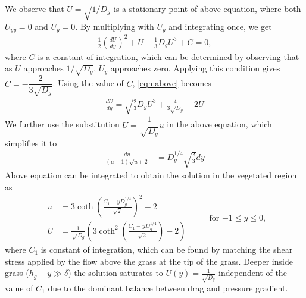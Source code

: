 \documentclass[letterpaper,10pt]{article}
\begin{document}
\noindent
We observe that $U = \sqrt{1/D_g}$ is a stationary point of above equation, where both $U_{yy}=0$ and $U_y =0 $. By multiplying with $U_y$ and integrating once, we get
\begin{equation}
\begin{split}
 \frac{1}{2} \left( \frac{dU}{dy} \right)^2 +U - \frac{1}{3} D_g U^3 + C = 0,
\end{split}
\label{eqn:above}
\end{equation}
where $C$ is a constant of integration, which can be determined by observing that as $U$ approaches $1/\sqrt{D_g}$, $U_y$ approaches zero. Applying this condition gives $C = -\dfrac{2}{3\sqrt{D_g}}$. Using the value of $C$, \eqref{eqn:above} becomes 
\begin{equation}
\begin{split}
 \frac{dU}{dy} = \sqrt{\frac{2}{3}D_g U^3+\frac{4}{3\sqrt{D_g}}-2U }
\end{split}
\end{equation}
We further use the substitution $U=\dfrac{1}{\sqrt{D_g}} u $ in the above equation, which simplifies it to
\begin{equation}
\begin{split}
 \frac{du}{(u-1)\sqrt{u+2} } &= {D_g^{1/4}}\sqrt{\frac{2}{3}} dy
\end{split}
\end{equation}
Above equation can be integrated to obtain the solution in the vegetated region as
\begin{equation}
\begin{split}
u &= 3 \coth \left(\frac{C_1-y D_g^{1/4}}{\sqrt{2}}  \right)^2-2 \\
U &= \frac{1}{\sqrt{D_g}} \left( 3 \coth^2 \left(\frac{C_1-y D_g^{1/4}}{\sqrt{2}}  \right)-2    \right)
\label{under_grass_sol}
\end{split}
 \hspace{1cm} \text{for $-1\le y\le 0$,}
\end{equation}
where $C_1$ is constant of integration, which can be found by matching the shear stress applied by the flow above the grass at the tip of the grass. Deeper inside grass ($h_g-y \gg \delta$) the solution saturates to $U(y)=\frac{1}{\sqrt{D_g}}$ independent of the value of $C_1$ due to the dominant balance between drag and pressure gradient.
\end{document}
